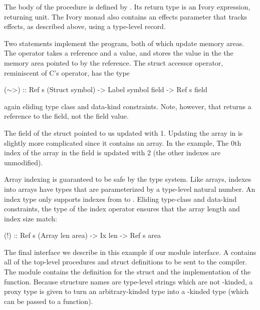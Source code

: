 The body of the procedure is defined by .  Its return type is an Ivory
expression, returning unit.  The Ivory monad also contains an effects parameter
that tracks effects, as described above, using a type-level record.

Two statements implement the program, both of which update memory areas.  The
 operator takes a reference and a value, and stores the value in the
the memory area pointed to by the reference.  The struct accessor operator,
reminiscent of C's \cd{->} operator, has the type
\begin{code}
(\(\sim\)>) :: Ref s (Struct symbol)
      -> Label symbol field -> Ref s field
\end{code}
\noindent
again eliding type class and data-kind constraints.  Note, however, that \cd{\~>} returns a reference to the field, not the field value.

The  field of the struct pointed to us updated with 1.  Updating the
array in  is slightly more complicated since it contains an array. In
the example, The 0th index of the array in the  field is updated with 2
(the other indexes are unmodified).

Array indexing is guaranteed to be safe by the type system.  Like arrays,
indexes into arrays have types that are parameterized by a type-level natural
number.  An index type  only supports indexes from  to .
Eliding type-class and data-kind constraints, the type of the index operator
ensures that the array length and index size match:
\begin{code}
(!) :: Ref s (Array len area) -> Ix len -> Ref s area
\end{code}

The final interface we describe in this example if our module interface.
A  contains all of the top-level procedures and struct definitions to
be sent to the compiler.  The module  contains the definition
for the struct and the implementation of the function.  Because structure names
are type-level strings which are not \cd{*}-kinded, a proxy type is given to
turn an arbitrary-kinded type into a \cd{*}-kinded type (which can be passed to
a function).



